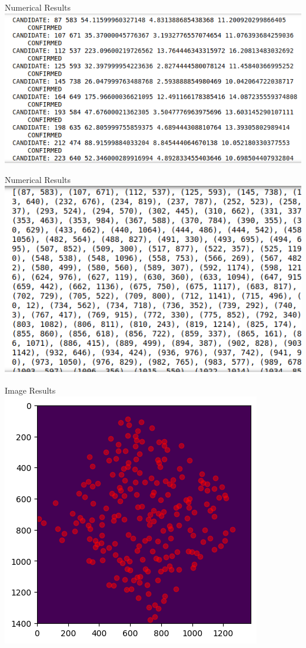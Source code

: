 \documentclass[aspectratio=43]{beamer}
\begin{document}
\begin{frame}{Numerical Results}
  \centering
  \includegraphics[scale = .5]{starnum1.png}
\end{frame}

\begin{frame}{Numerical Results}
  \centering
  \includegraphics[scale = .5]{starcoords.png}
\end{frame}
\begin{frame}{Image Results}
  \centering
  \includegraphics[scale = .75]{finalresults.png}
\end{frame}
\end{document}
